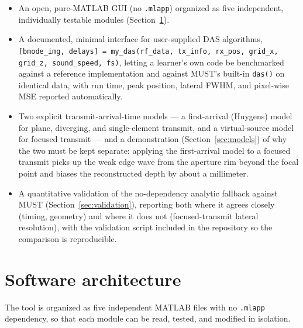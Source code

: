 \documentclass[11pt]{article}
\newcommand{\code}[1]{\texttt{#1}}
\newcommand{\must}{MUST}
\begin{document}
\begin{itemize}[leftmargin=*]
  \item An open, pure-MATLAB GUI (no \code{.mlapp}) organized as five
  independent, individually testable modules (Section~\ref{sec:architecture}).
  \item A documented, minimal interface for user-supplied DAS algorithms,
  \code{[bmode\_img, delays] = my\_das(rf\_data, tx\_info, rx\_pos, grid\_x,
  grid\_z, sound\_speed, fs)}, letting a learner's own code be benchmarked
  against a reference implementation and against \must's built-in
  \code{das()} on identical data, with run time, peak position, lateral
  FWHM, and pixel-wise MSE reported automatically.
  \item Two explicit transmit-arrival-time models --- a first-arrival
  (Huygens) model for plane, diverging, and single-element transmit, and a
  virtual-source model for focused transmit --- and a demonstration
  (Section~\ref{sec:models}) of why the two must be kept separate: applying
  the first-arrival model to a focused transmit picks up the weak edge wave
  from the aperture rim beyond the focal point and biases the reconstructed
  depth by about a millimeter.
  \item A quantitative validation of the no-dependency analytic fallback
  against \must{} (Section~\ref{sec:validation}), reporting both where it
  agrees closely (timing, geometry) and where it does not (focused-transmit
  lateral resolution), with the validation script included in the
  repository so the comparison is reproducible.
\end{itemize}

\section{Software architecture}
\label{sec:architecture}

The tool is organized as five independent MATLAB files with no \code{.mlapp}
dependency, so that each module can be read, tested, and modified in
isolation.
\end{document}
